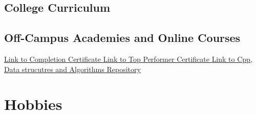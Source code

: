 \documentclass[11pt,a4paper,sans]{moderncv} %
\begin{document}
    \subsection{College Curriculum}
  
    \subsection{Off-Campus Academies and Online Courses}
    \cvitem{*} {\href{https://github.com/teetangh/Kaustav-All-Certifications/blob/master/Programming/Coding\%20Ninjas/Coding\%20Ninjas\%20Cpp\%20Completion\%20Certificate.pdf}{Link to Completion Certificate }}
    \cvitem{*} {\href{https://github.com/teetangh/Kaustav-All-Certifications/blob/master/Programming/Coding\%20Ninjas/Coding\%20Ninjas\%20Cpp\%20Top\%20Performer\%20Certificate.pdf}{Link to Top Performer Certificate }}
    \cvitem{*} {\href{https://github.com/teetangh/Kaustav-Competitive-Coding}{Link to Cpp, Data strucutres and Algorithms Repository}}


\section{Hobbies}

\renewcommand{\listitemsymbol}{-~} %


\end{document}
